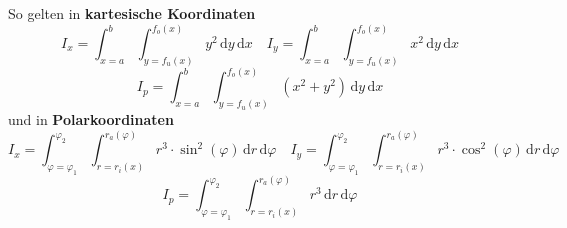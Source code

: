 So gelten in \textbf{kartesische Koordinaten} 
\begin{equation}
\boxed{I_x=\displaystyle \int_{x=a}^{b}\displaystyle \int_{y=f_u\left(x\right)}^{f_o\left(x\right)}y^2\,\text{d}y\,\text{d}x}\quad \boxed{I_y=\displaystyle \int_{x=a}^{b}\displaystyle \int_{y=f_u\left(x\right)}^{f_o\left(x\right)}x^2\,\text{d}y\,\text{d}x}
\end{equation}
\begin{equation}
\boxed{I_p=\displaystyle \int_{x=a}^{b}\displaystyle \int_{y=f_u\left(x\right)}^{f_o\left(x\right)}\left(x^2+y^2\right)\,\text{d}y\,\text{d}x}
\end{equation}
und in \textbf{Polarkoordinaten}
\begin{equation}
\boxed{I_x=\displaystyle \int_{\varphi=\varphi_1}^{\varphi_2}\displaystyle \int_{r=r_i\left(x\right)}^{r_a\left(\varphi\right)}r^3\cdot \sin^2\left(\varphi\right)\,\text{d}r\,\text{d}\varphi}\quad \boxed{I_y=\displaystyle \int_{\varphi=\varphi_1}^{\varphi_2}\displaystyle \int_{r=r_i\left(x\right)}^{r_a\left(\varphi\right)}r^3\cdot \cos^2\left(\varphi\right)\,\text{d}r\,\text{d}\varphi}
\end{equation}
\begin{equation}
\boxed{I_p=\displaystyle \int_{\varphi=\varphi_1}^{\varphi_2}\displaystyle \int_{r=r_i\left(x\right)}^{r_a\left(\varphi\right)}r^3\,\text{d}r\,\text{d}\varphi}
\end{equation}
